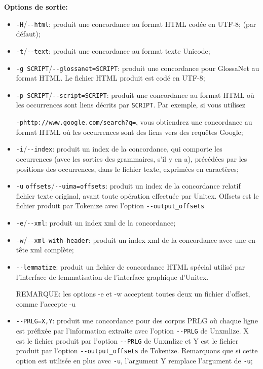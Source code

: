 \bigskip
\noindent \textbf{Options de sortie:}
\begin{itemize}
  \item \verb+-H+/\verb+--html+: produit une concordance au format HTML codée en UTF-8;
  	   (par défaut);
  \item \verb+-t+/\verb+--text+: produit une concordance au format texte Unicode; 
  \item \verb+-g SCRIPT+/\verb+--glossanet=SCRIPT+: produit une concordance pour GlossaNet
  	  au format HTML. Le fichier HTML produit est codé en UTF-8;
  \item \verb+-p SCRIPT+/\verb+--script=SCRIPT+: produit une concordance au format HTML où les
  	  occurrences sont liens décrits par \verb+SCRIPT+. Par exemple, si vous utilisez
  	  
  \verb$-phttp://www.google.com/search?q=$, vous obtiendrez 
  une concordance au format HTML où les occurrences sont des liens vers des requêtes Google;

\item \verb+-i+/\verb+--index+: produit un index de la concordance, qui comporte
	les occurrences (avec les sorties des grammaires, s'il y en a), précédées par
	les positions des occurrences, dans le fichier texte, exprimées en caractères;
\item \verb+-u+ \verb+offsets+/\verb+--uima=offsets+: produit un index de la concordance relatif
	fichier texte original, avant toute opération effectuée par Unitex. Offsets 
	est le fichier produit par Tokenize avec l'option \verb+--output_offsets+
\item \verb+-e+/\verb+--xml+: produit un index xml de la concordance;
\item \verb+-w+/\verb+--xml-with-header+: produit un index xml de la concordance avec une en-tête
	xml complète;
\item \verb+--lemmatize+: produit un fichier de concordance HTML spécial utilisé par l'interface de lemmatisation
	de l'interface graphique d'Unitex.


	REMARQUE:  les options -e et -w acceptent toutes deux un fichier d'offset, comme l'accepte -u 
\item \verb+--PRLG=X,Y+: produit une concordance pour des corpus PRLG où chaque ligne
	est préfixée par l'information extraite avec l'option \verb+--PRLG+ de Unxmlize. X est le
	fichier produit par l'option \verb+--PRLG+ de Unxmlize et Y est le fichier produit par
	l'option \verb+--output_offsets+ de Tokenize. Remarquons que si cette option est utilisée en
	plus avec \verb+-u+, l'argument Y remplace l'argument de \verb+-u+;
	

\end{itemize}

